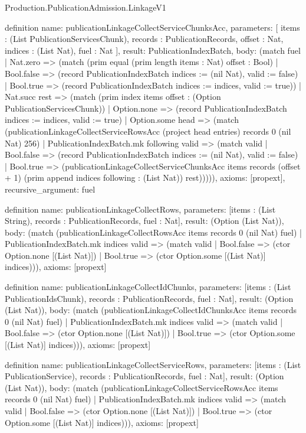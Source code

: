 \begin{lexlean}{Production.PublicationAdmission.LinkageV1}
\begin{semanticmodule}
definition{
  name: publicationLinkageCollectServiceChunksAcc,
  parameters: [
    items : (List PublicationServicesChunk),
    records : PublicationRecords,
    offset : Nat,
    indices : (List Nat),
    fuel : Nat
  ],
  result: PublicationIndexBatch,
  body: (match fuel
    | Nat.zero => (match (prim equal (prim length items : Nat) offset : Bool)
      | Bool.false => (record PublicationIndexBatch {indices := (nil Nat), valid := false})
      | Bool.true => (record PublicationIndexBatch {indices := indices, valid := true}))
    | Nat.succ rest => (match (prim index items offset : (Option PublicationServicesChunk))
      | Option.none => (record PublicationIndexBatch {indices := indices, valid := true})
      | Option.some head => (match (publicationLinkageCollectServiceRowsAcc (project head entries) records 0 (nil Nat) 256)
        | PublicationIndexBatch.mk following valid => (match valid
          | Bool.false => (record PublicationIndexBatch {indices := (nil Nat), valid := false})
          | Bool.true => (publicationLinkageCollectServiceChunksAcc items records (offset + 1) (prim append indices following : (List Nat)) rest))))),
  axioms: [propext],
  recursive_argument: fuel
}

definition{
  name: publicationLinkageCollectRows,
  parameters: [items : (List String), records : PublicationRecords, fuel : Nat],
  result: (Option (List Nat)),
  body: (match (publicationLinkageCollectRowsAcc items records 0 (nil Nat) fuel)
    | PublicationIndexBatch.mk indices valid => (match valid
      | Bool.false => (ctor Option.none [(List Nat)])
      | Bool.true => (ctor Option.some [(List Nat)] indices))),
  axioms: [propext]
}

definition{
  name: publicationLinkageCollectIdChunks,
  parameters: [items : (List PublicationIdsChunk), records : PublicationRecords, fuel : Nat],
  result: (Option (List Nat)),
  body: (match (publicationLinkageCollectIdChunksAcc items records 0 (nil Nat) fuel)
    | PublicationIndexBatch.mk indices valid => (match valid
      | Bool.false => (ctor Option.none [(List Nat)])
      | Bool.true => (ctor Option.some [(List Nat)] indices))),
  axioms: [propext]
}

definition{
  name: publicationLinkageCollectServiceRows,
  parameters: [items : (List PublicationService), records : PublicationRecords, fuel : Nat],
  result: (Option (List Nat)),
  body: (match (publicationLinkageCollectServiceRowsAcc items records 0 (nil Nat) fuel)
    | PublicationIndexBatch.mk indices valid => (match valid
      | Bool.false => (ctor Option.none [(List Nat)])
      | Bool.true => (ctor Option.some [(List Nat)] indices))),
  axioms: [propext]
}


\end{semanticmodule}
\end{lexlean}
